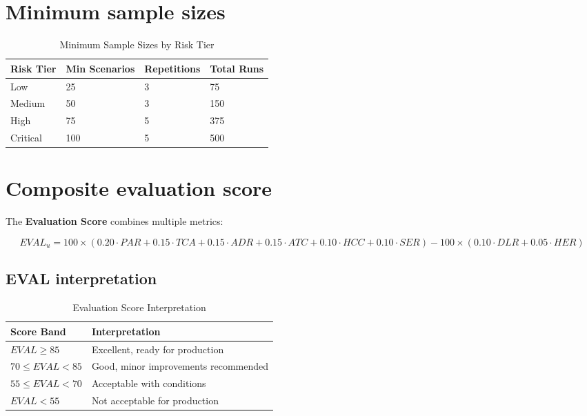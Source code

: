 \section{Minimum sample sizes}

\begin{table}[htbp]
\centering
\caption{Minimum Sample Sizes by Risk Tier}
\label{tab:sample-sizes}
\begin{tabular}{l l l l}
\toprule
\textbf{Risk Tier} & \textbf{Min Scenarios} & \textbf{Repetitions} & \textbf{Total Runs} \\
\midrule
Low & 25 & 3 & 75 \\
Medium & 50 & 3 & 150 \\
High & 75 & 5 & 375 \\
Critical & 100 & 5 & 500 \\
\bottomrule
\end{tabular}
\end{table}

\section{Composite evaluation score}

The \textbf{Evaluation Score} combines multiple metrics:

\begin{equation}
\boxed{
EVAL_u = 100 \times \left(
  0.20 \cdot PAR + 
  0.15 \cdot TCA + 
  0.15 \cdot ADR + 
  0.15 \cdot ATC + 
  0.10 \cdot HCC + 
  0.10 \cdot SER
\right) - 100 \times \left(
  0.10 \cdot DLR + 
  0.05 \cdot HER
\right)
}
\label{eq:eval}
\end{equation}

\subsection{EVAL interpretation}

\begin{table}[htbp]
\centering
\caption{Evaluation Score Interpretation}
\begin{tabular}{l l}
\toprule
\textbf{Score Band} & \textbf{Interpretation} \\
\midrule
$EVAL \geq 85$ & Excellent, ready for production \\
$70 \leq EVAL < 85$ & Good, minor improvements recommended \\
$55 \leq EVAL < 70$ & Acceptable with conditions \\
$EVAL < 55$ & Not acceptable for production \\
\bottomrule
\end{tabular}
\end{table}

